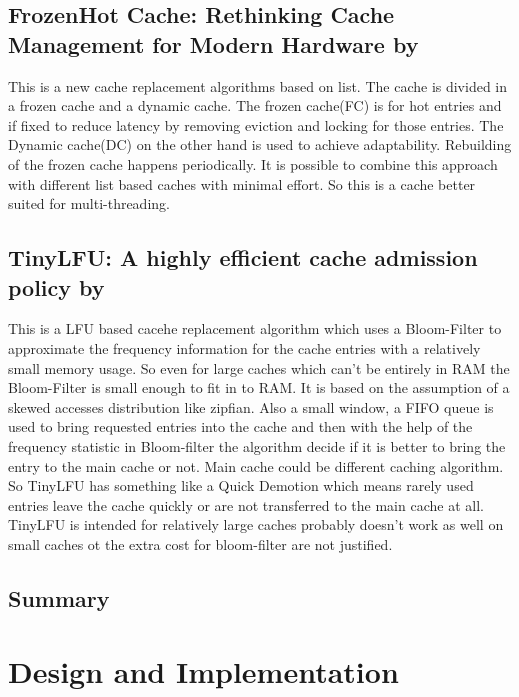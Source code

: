 \documentclass[
	12pt,
	a4paper,
	abstract,
	bibliography=totoc,
	chapterprefix,
	headings=openright,
	numbers=endperiod,
	parskip=half,
	twoside,
]{scrreprt}
\begin{document}
\section*{FrozenHot Cache: Rethinking Cache Management for Modern Hardware by \cite{qiu2023frozenhot}}

This is a new cache replacement algorithms based on list.
The cache is divided in a frozen cache and a dynamic cache.
The frozen cache(FC) is for hot entries and if fixed to reduce latency by removing eviction and locking for those entries. 
The Dynamic cache(DC) on the other hand is used to achieve adaptability.
Rebuilding of the frozen cache happens periodically.
It is possible to combine this approach with different list based caches with minimal effort.
So this is a cache better suited for multi-threading.

\section*{TinyLFU: A highly efficient cache admission policy by \cite{einziger2017tinylfu}}

This is a LFU based cacehe replacement algorithm which uses a Bloom-Filter to approximate the frequency information for the cache entries with a relatively small memory usage.
So even for large caches which can't be entirely in RAM the Bloom-Filter is small enough to fit in to RAM.
It is based on the assumption of a skewed accesses distribution like zipfian.
Also a small window, a FIFO queue is used to bring requested entries into the cache and then
with the help of the frequency statistic in Bloom-filter the algorithm decide if it is better to bring the entry to the main cache or not. Main cache could be different caching algorithm.
So TinyLFU has something like a Quick Demotion which means rarely used entries leave the cache quickly or are not transferred to the main cache at all.
TinyLFU is intended for relatively large caches probably doesn't work as well on small caches ot the extra cost for bloom-filter are not justified.


\section*{Summary}

\chapter{Design and Implementation}
\label{cha:design and implementation}
\end{document}
